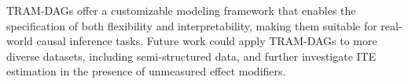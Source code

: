 \documentclass[11pt,a4paper,twoside]{book}
\begin{document}
TRAM-DAGs offer a customizable modeling framework that enables the specification of both flexibility and interpretability, making them suitable for real-world causal inference tasks. Future work could apply TRAM-DAGs to more diverse datasets, including semi-structured data, and further investigate ITE estimation in the presence of unmeasured effect modifiers.


% 
% 
% 
\end{document}
